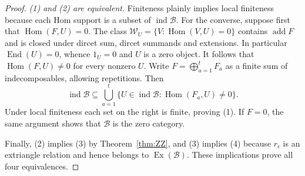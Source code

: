 \documentclass[pdflatex,sn-mathphys-num]{sn-jnl}
\numberwithin{equation}{section}
\theoremstyle{definition}
\theoremstyle{remark}\newtheorem{remark}[theorem]{Remark}
\newcommand{\Hom}{\operatorname{Hom}}
\newcommand{\End}{\operatorname{End}}
\newcommand{\ind}{\operatorname{ind}}
\newcommand{\add}{\operatorname{add}}
\newcommand{\Ex}{\operatorname{Ex}}
\begin{document}
\begin{proof}
\emph{(1) and (2) are equivalent.} Finiteness plainly implies local
finiteness because each Hom support is a subset of $\ind\mathcal B$.
For the converse, suppose first that $\Hom(F,U)=0$. The class
$\mathcal W_U=\{V:\Hom(V,U)=0\}$ contains $\add F$ and is closed
under dircet sum, dircet summands and extensions.
In particular $\End(U)=0$, whence $1_U=0$ and $U$ is a zero object.
It follows that $\Hom(F,U)\ne0$ for every nonzero $U$.
Write $F=\bigoplus_{a=1}^t F_a$ as a finite sum of indecomposables,
allowing repetitions. Then
\[
 \ind\mathcal B\subseteq
 \bigcup_{a=1}^t\{U\in\ind\mathcal B:\Hom(F_a,U)\ne0\}.
\]
Under local finiteness each set on the right is finite, proving (1).
If $F=0$, the same argument shows that $\mathcal B$ is the zero category.

Finally, (2) implies (3) by Theorem~\ref{thm:ZZ}, and (3) implies
(4) because $r_\epsilon$ is an extriangle relation and hence belongs
to $\Ex(\mathcal B)$. These implications prove all four equivalences.
\end{proof}
\end{document}
